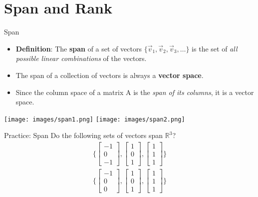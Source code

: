 \section{Span and Rank}

\begin{frame}{Span}
    \begin{itemize}
        \item \textbf{Definition}: The \textbf{span} of a set of vectors $\{\vec{v}_1, \vec{v}_2, \vec{v}_3, \dots\}$ is the set of \textit{all possible linear combinations} of the vectors.
        \item The span of a collection of vectors is always a \textbf{vector space}.
        \item Since the column space of a matrix A is the \textit{span of its columns}, it is a vector space.
    \end{itemize}
    \begin{center}
        \texttt{[image: images/span1.png]}
        \texttt{[image: images/span2.png]}
    \end{center}
\end{frame}

\begin{frame}{Practice: Span}
    Do the following sets of vectors span $\mathbb{R}^3$?
    \begin{align*}
        \bigg\{
            \begin{bmatrix} -1 \\ 0 \\ -1 \end{bmatrix},
            \begin{bmatrix} 1 \\ 0 \\ 1 \end{bmatrix},
            \begin{bmatrix} 1 \\ 1 \\ 1 \end{bmatrix} 
        \bigg\} \\
        \bigg\{
            \begin{bmatrix} -1 \\ 0 \\ 0 \end{bmatrix},
            \begin{bmatrix} 1 \\ 0 \\ 1 \end{bmatrix},
            \begin{bmatrix} 1 \\ 1 \\ 1 \end{bmatrix} 
        \bigg\}
    \end{align*}
\end{frame}

